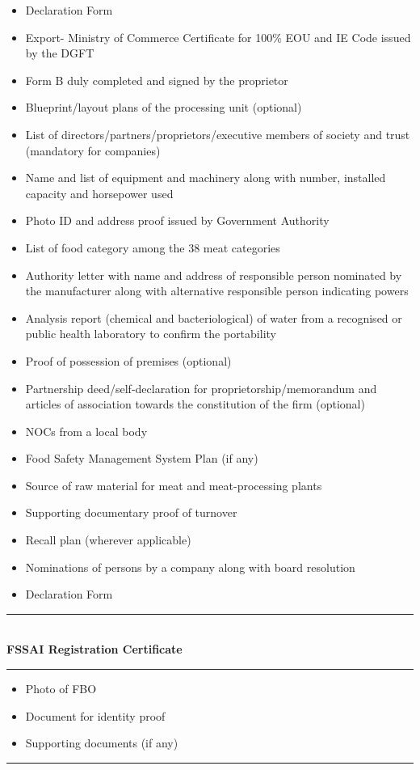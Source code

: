\documentclass[a4paper, 12pt, twoside]{article}
\begin{document}
\begin{itemize}[noitemsep]
\item Declaration Form 
\item Export- Ministry of Commerce Certificate for 100\% EOU and IE Code issued by the DGFT 
\item Form B duly completed and signed by the proprietor
\item Blueprint/layout plans of the processing unit (optional) 
\item List of directors/partners/proprietors/executive members of society and trust (mandatory for companies) 
\item Name and list of equipment and machinery along with number, installed capacity and horsepower used 
\item Photo ID and address proof issued by Government Authority 
\item List of food category among the 38 meat categories 
\item Authority letter with name and address of responsible person nominated by the manufacturer along with alternative responsible person indicating powers 
\item Analysis report (chemical and bacteriological) of water from a recognised or public health laboratory to confirm the portability 
\item Proof of possession of premises (optional) 
\item Partnership deed/self-declaration for proprietorship/memorandum and articles of association towards the constitution of the firm (optional) 
\item NOCs from a local body 
\item Food Safety Management System Plan (if any) 
\item Source of raw material for meat and meat-processing plants 
\item Supporting documentary proof of turnover 
\item Recall plan (wherever applicable) 
\item Nominations of persons by a company along with board resolution 
\item Declaration Form 
\end{itemize}
\noindent\rule{16cm}{0.4pt}\\
\textbf{FSSAI Registration Certificate}\\
\noindent\rule{16cm}{0.4pt}
\begin{itemize}[noitemsep]
\item Photo of FBO 
\item Document for identity proof 
\item Supporting documents (if any) 
\end{itemize}
\noindent\rule{16cm}{0.4pt}\\
\newpage
\end{document}

